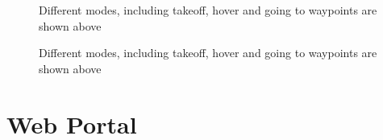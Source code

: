 \begin{figure}[!h]
	\hfill
	\hfill
	\hfill
	\caption{\label{fig: fin_mis_3}Different modes, including takeoff, hover and going to waypoints are shown above}
\end{figure} 


\begin{figure}[!h]
	\hfill
	\hfill
	\hfill
	\caption{\label{fig: fin_mis_4}Different modes, including takeoff, hover and going to waypoints are shown above}
\end{figure} 



\section{Web Portal}

